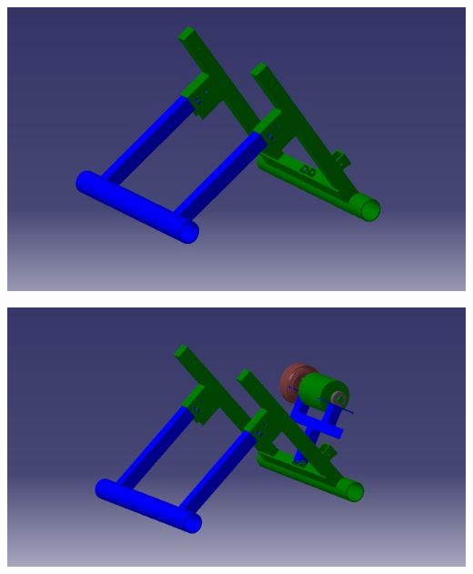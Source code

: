     \begin{center}
    	\includegraphics[scale=0.5]{figuras/esquema_traseira_1}
        \label{esquema_traseira_1}
    \end{center}    

    \begin{center}
    	\includegraphics[scale=0.5]{figuras/parte_traseira_2}
        \label{parte_traseira_2}
    \end{center}        
   
